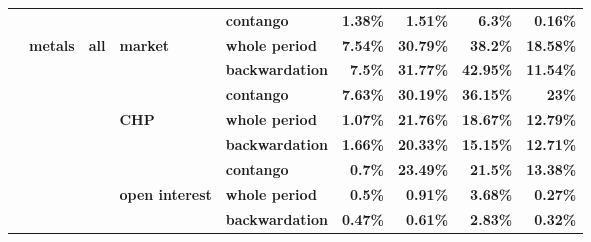 \documentclass[
  authoryear,
  preprint,
  3p]{elsarticle}
\begin{document}
\begin{longtable}[t]{>{}l>{}l>{}l>{}l>{}l>{}r>{}r>{}r>{}r}
\textbf{} & \textbf{} & \textbf{} & \textbf{} & \textbf{contango} & \textcolor[HTML]{4285f4}{\textbf{1.38\%}} & \textcolor[HTML]{4285f4}{\textbf{1.51\%}} & \textcolor[HTML]{4285f4}{\textbf{6.3\%}} & \textcolor[HTML]{4285f4}{\textbf{0.16\%}}\\
\textbf{} & \textbf{metals} & \textbf{all} & \textbf{market} & \textbf{whole period} & \textcolor[HTML]{4285f4}{\textbf{7.54\%}} & \textcolor[HTML]{4285f4}{\textbf{30.79\%}} & \textcolor[HTML]{4285f4}{\textbf{38.2\%}} & \textcolor[HTML]{4285f4}{\textbf{18.58\%}}\\
\textbf{} & \textbf{} & \textbf{} & \textbf{} & \textbf{backwardation} & \textcolor[HTML]{4285f4}{\textbf{7.5\%}} & \textcolor[HTML]{4285f4}{\textbf{31.77\%}} & \textcolor[HTML]{4285f4}{\textbf{42.95\%}} & \textcolor[HTML]{4285f4}{\textbf{11.54\%}}\\
\addlinespace
\textbf{} & \textbf{} & \textbf{} & \textbf{} & \textbf{contango} & \textcolor[HTML]{4285f4}{\textbf{7.63\%}} & \textcolor[HTML]{4285f4}{\textbf{30.19\%}} & \textcolor[HTML]{4285f4}{\textbf{36.15\%}} & \textcolor[HTML]{4285f4}{\textbf{23\%}}\\
\textbf{} & \textbf{} & \textbf{} & \textbf{CHP} & \textbf{whole period} & \textcolor[HTML]{4285f4}{\textbf{1.07\%}} & \textcolor[HTML]{4285f4}{\textbf{21.76\%}} & \textcolor[HTML]{4285f4}{\textbf{18.67\%}} & \textcolor[HTML]{4285f4}{\textbf{12.79\%}}\\
\textbf{} & \textbf{} & \textbf{} & \textbf{} & \textbf{backwardation} & \textcolor[HTML]{4285f4}{\textbf{1.66\%}} & \textcolor[HTML]{4285f4}{\textbf{20.33\%}} & \textcolor[HTML]{4285f4}{\textbf{15.15\%}} & \textcolor[HTML]{4285f4}{\textbf{12.71\%}}\\
\textbf{} & \textbf{} & \textbf{} & \textbf{} & \textbf{contango} & \textcolor[HTML]{4285f4}{\textbf{0.7\%}} & \textcolor[HTML]{4285f4}{\textbf{23.49\%}} & \textcolor[HTML]{4285f4}{\textbf{21.5\%}} & \textcolor[HTML]{4285f4}{\textbf{13.38\%}}\\
\textbf{} & \textbf{} & \textbf{} & \textbf{open interest} & \textbf{whole period} & \textcolor[HTML]{4285f4}{\textbf{0.5\%}} & \textcolor[HTML]{4285f4}{\textbf{0.91\%}} & \textcolor[HTML]{4285f4}{\textbf{3.68\%}} & \textcolor[HTML]{4285f4}{\textbf{0.27\%}}\\
\addlinespace
\textbf{} & \textbf{} & \textbf{} & \textbf{} & \textbf{backwardation} & \textcolor[HTML]{4285f4}{\textbf{0.47\%}} & \textcolor[HTML]{4285f4}{\textbf{0.61\%}} & \textcolor[HTML]{4285f4}{\textbf{2.83\%}} & \textcolor[HTML]{4285f4}{\textbf{0.32\%}}\\

\end{longtable}
\end{document}
